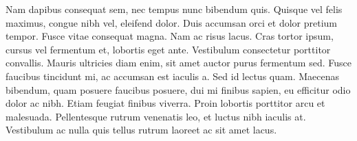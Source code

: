 \documentclass[english]{jamk-report}
\begin{document}
Nam dapibus consequat sem, nec tempus nunc bibendum quis. Quisque vel felis
maximus, congue nibh vel, eleifend dolor. Duis accumsan orci et dolor pretium
tempor. Fusce vitae consequat magna. Nam ac risus lacus. Cras tortor ipsum,
cursus vel fermentum et, lobortis eget ante. Vestibulum consectetur porttitor
convallis. Mauris ultricies diam enim, sit amet auctor purus fermentum sed.
Fusce faucibus tincidunt mi, ac accumsan est iaculis a. Sed id lectus quam.
Maecenas bibendum, quam posuere faucibus posuere, dui mi finibus sapien, eu
efficitur odio dolor ac nibh. Etiam feugiat finibus viverra. Proin lobortis
porttitor arcu et malesuada.  Pellentesque rutrum venenatis leo, et luctus nibh
iaculis at.  Vestibulum ac nulla quis tellus rutrum laoreet ac sit amet lacus.


\end{document}
